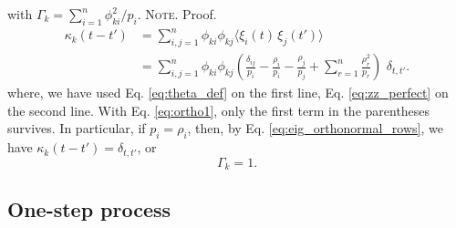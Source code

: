 \documentclass[reprint, superscriptaddress, floatfix]{revtex4-1}
\newcommand{\note}[1]{{\color{DarkGreen}\footnotesize \textsc{Note.} #1}}
\begin{document}
with
$\Gamma_k = \sum_{ i = 1}^n \phi_{ki}^2 / p_i$.
\note{Proof.%
  $$
  \begin{aligned}
  \kappa_k(t - t')
  &=
  \sum_{i,j = 1}^n
  \phi_{ki}
  \phi_{kj}
  \langle \xi_i(t) \, \xi_j(t') \rangle
  \\
  &=
  \sum_{i,j = 1}^n
  \phi_{ki}
  \phi_{kj}
  \left(
    \frac{ \delta_{ij} } { p_i }
    -
    \frac{ \rho_i } { p_i }
    -
    \frac{ \rho_j } { p_j }
    +
    \sum_{r = 1}^n
    \frac{ \rho_r^2 } { p_r }
  \right) \,
  \, \delta_{t, t'}
  .
  \end{aligned}
  $$
  where,
  we have used
  Eq. \eqref{eq:theta_def}
  on the first line,
  Eq. \eqref{eq:zz_perfect}
  on the second line.
  With Eq. \eqref{eq:ortho1},
  only the first term in the parentheses survives.
}
In particular, if $p_i = \rho_i$, then, by
Eq. \eqref{eq:eig_orthonormal_rows}, we have
$\kappa_k(t - t') = \delta_{t, t'}$, or
\begin{equation}
  \Gamma_k = 1
  .
\label{eq:Gamma_perfect}
\end{equation}




\subsection{\label{sec:Gamma_onestep}
One-step process}
\end{document}
